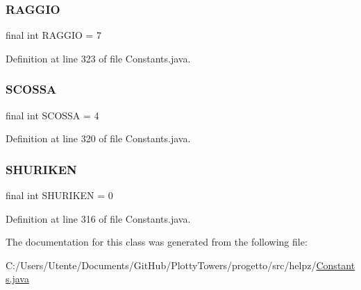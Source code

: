 \subsubsection{\texorpdfstring{R\+A\+G\+G\+IO}{RAGGIO}}
{\footnotesize\ttfamily final int R\+A\+G\+G\+IO = 7\hspace{0.3cm}{\ttfamily [static]}}



Definition at line 323 of file Constants.\+java.

\mbox{\label{classhelpz_1_1_constants_1_1_projectiles_af4b1c3360609f1f3d4a9d86a2d469820}} 
\subsubsection{\texorpdfstring{S\+C\+O\+S\+SA}{SCOSSA}}
{\footnotesize\ttfamily final int S\+C\+O\+S\+SA = 4\hspace{0.3cm}{\ttfamily [static]}}



Definition at line 320 of file Constants.\+java.

\mbox{\label{classhelpz_1_1_constants_1_1_projectiles_aa69d45a11b219eda06b3c3a9826788c2}} 
\subsubsection{\texorpdfstring{S\+H\+U\+R\+I\+K\+EN}{SHURIKEN}}
{\footnotesize\ttfamily final int S\+H\+U\+R\+I\+K\+EN = 0\hspace{0.3cm}{\ttfamily [static]}}



Definition at line 316 of file Constants.\+java.



The documentation for this class was generated from the following file\+:\begin{DoxyCompactItemize}
\item 
C\+:/\+Users/\+Utente/\+Documents/\+Git\+Hub/\+Plotty\+Towers/progetto/src/helpz/\hyperlink{_constants_8java}{Constants.\+java}\end{DoxyCompactItemize}

